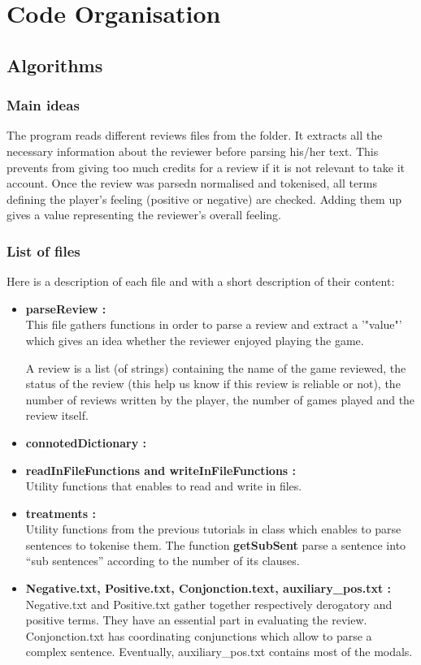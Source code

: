 \documentclass[paper=a4,fontsize=12pt]{report}
\begin{document}
\chapter{Code Organisation}
\section{Algorithms}
\subsection{Main ideas}
The program reads different reviews files from the folder. It extracts all the necessary information about the reviewer before parsing his/her text. This prevents from giving too much credits for a review if it is not relevant to take it account. Once the review was parsedn normalised and tokenised, all terms defining the player's feeling (positive or negative) are checked. Adding them up gives a value representing the reviewer's overall feeling.
\\


\subsection{List of files}
	Here is a description of each file and with a short description of their content:
\begin{itemize}
	\item \textbf{parseReview :} \\
This file gathers functions in order to parse a review and extract a '"value"' which gives an idea whether the reviewer enjoyed playing the game.

A review is a list (of strings) containing  the name of the game reviewed, the status of the review (this help us know if this review is reliable or not), the number of reviews written by the player, the number of games played and the review itself. 

	\item \textbf{connotedDictionary :} \\

	\item \textbf{readInFileFunctions and writeInFileFunctions :} \\
Utility functions that enables to read and write in files. 

	\item \textbf{treatments :} \\  
Utility functions from the previous tutorials in class which enables to parse sentences to tokenise them. The function \textbf{getSubSent} parse a sentence into "`sub sentences"' according to the number of its clauses.

	\item \textbf{Negative.txt, Positive.txt, Conjonction.text, auxiliary\_pos.txt :} \\
Negative.txt and Positive.txt gather together respectively derogatory and positive terms. They have an essential part in evaluating the review. Conjonction.txt has coordinating conjunctions which allow to parse a complex sentence. Eventually, auxiliary\_pos.txt contains most of the modals.\\
\end{itemize}
\end{document}
